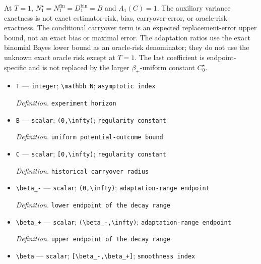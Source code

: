 \documentclass{article}
\begin{document}
\[\] At \(T=1\), \(N_1^\star=N_1^{\mathrm{fin}}=D_1^{\mathrm{bin}}=B\) and \(A_1(C)=1\). The auxiliary variance exactness is not exact estimator-risk, bias, carryover-error, or oracle-risk exactness. The conditional carryover term is an expected replacement-error upper bound, not an exact bias or maximal error. The adaptation ratios use the exact binomial Bayes lower bound as an oracle-risk denominator; they do not use the unknown exact oracle risk except at \(T=1\). The last coefficient is endpoint-specific and is not replaced by the larger \(\beta_+\)-uniform constant \(C_0^\star\).
\begin{itemize}
  \item \texttt{T} --- \texttt{integer}; \texttt{\textbackslash{}\allowbreak{}mathbb N}; \texttt{asymptotic index}
  \par\smallskip\noindent\emph{Definition.} \texttt{experiment horizon}
  \item \texttt{B} --- \texttt{scalar}; \texttt{(0,\allowbreak{}\textbackslash{}\allowbreak{}infty)}; \texttt{regularity constant}
  \par\smallskip\noindent\emph{Definition.} \texttt{uniform potential-\allowbreak{}outcome bound}
  \item \texttt{C} --- \texttt{scalar}; \texttt{[0,\allowbreak{}\textbackslash{}\allowbreak{}infty)}; \texttt{regularity constant}
  \par\smallskip\noindent\emph{Definition.} \texttt{historical carryover radius}
  \item \texttt{\textbackslash{}\allowbreak{}beta\_\allowbreak{}-\allowbreak{}} --- \texttt{scalar}; \texttt{(0,\allowbreak{}\textbackslash{}\allowbreak{}infty)}; \texttt{adaptation-\allowbreak{}range endpoint}
  \par\smallskip\noindent\emph{Definition.} \texttt{lower endpoint of the decay range}
  \item \texttt{\textbackslash{}\allowbreak{}beta\_\allowbreak{}+\allowbreak{}} --- \texttt{scalar}; \texttt{(\textbackslash{}\allowbreak{}beta\_\allowbreak{}-\allowbreak{},\allowbreak{}\textbackslash{}\allowbreak{}infty)}; \texttt{adaptation-\allowbreak{}range endpoint}
  \par\smallskip\noindent\emph{Definition.} \texttt{upper endpoint of the decay range}
  \item \texttt{\textbackslash{}\allowbreak{}beta} --- \texttt{scalar}; \texttt{[\textbackslash{}\allowbreak{}beta\_\allowbreak{}-\allowbreak{},\allowbreak{}\textbackslash{}\allowbreak{}beta\_\allowbreak{}+\allowbreak{}]}; \texttt{smoothness index}

\end{itemize}
\end{document}
